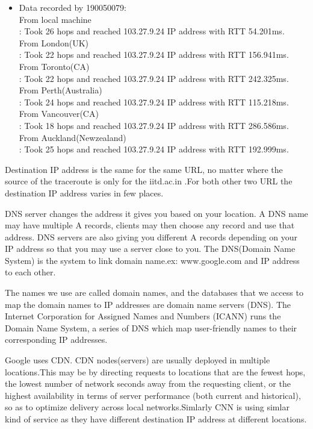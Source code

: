 \documentclass[12pt]{article}
\theoremstyle{remark}
\begin{document}
\begin{itemize}
\item Data recorded by 190050079:\\
From local machine  \\
: Took 26 hops and reached 103.27.9.24 IP address with RTT 54.201ms.\\
From London(UK)   \\
: Took 22 hops and reached 103.27.9.24  IP address with RTT 156.941ms.\\
From Toronto(CA)   \\
: Took 22 hops and reached 103.27.9.24 IP address with RTT 242.325ms.\\
From Perth(Australia)  \\
: Took 24 hops and reached 103.27.9.24 IP address with RTT 115.218ms.\\
From Vancouver(CA)       \\
: Took 18 hops and reached 103.27.9.24 IP address with RTT 286.586ms.\\
From Auckland(Newzealand)   \\
: Took 25 hops and reached 103.27.9.24 IP address with RTT  192.999ms.\\ 
\end{itemize}
 
 Destination IP address is the same for the same URL, no matter where the source of the
traceroute is only for the iitd.ac.in .For both other two URL the destination IP address varies in few places.

  \hspace{0.3in}  DNS server changes the address it gives you based on your location. A DNS name may have multiple A records, clients may then choose any record and use that address.
 DNS servers are also giving you different A records depending on your IP address so that you may use a server close to you. The DNS(Domain Name System) is the system to link domain name.ex: www.google.com and IP address
to each other.

\hspace{0.3in} 
The names we use are called domain names, and the databases that we access to map the domain names to IP addresses are domain name servers (DNS). The Internet Corporation for Assigned Names and Numbers (ICANN) runs the Domain Name System, a series of DNS which map user-friendly names to their corresponding IP addresses.

\hspace{0.3in}Google uses CDN.
CDN nodes(servers) are usually deployed in multiple locations.This may be by directing
requests to locations that are the fewest hops, the lowest number of network seconds
away from the requesting client, or the highest availability in terms of server performance
(both current and historical), so as to optimize delivery across local networks.Simlarly CNN
is using simlar kind of service as they have different destination IP address at different locations.
\end{document}
